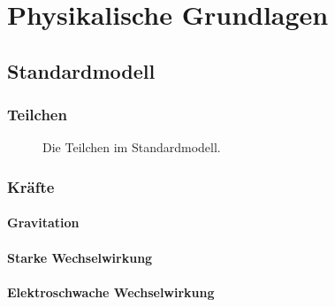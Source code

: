 \section{Physikalische Grundlagen}
\subsection{Standardmodell}
\subsubsection*{Teilchen}

\begin{figure}[H]
        \centering
        \def\svgwidth{0.55\textwidth}
       
        \caption{Die Teilchen im Standardmodell.}
        \label{img:standardmodel}
\end{figure}

\subsubsection*{Kräfte}
\paragraph{Gravitation}
\paragraph{Starke Wechselwirkung}
\paragraph{Elektroschwache Wechselwirkung}
